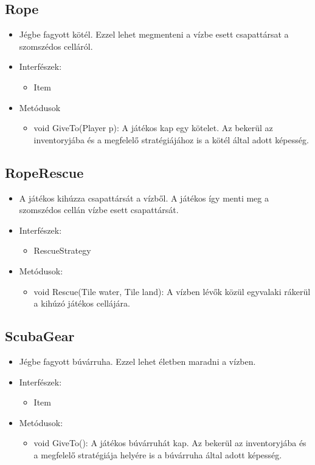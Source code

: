 \subsection{Rope}
\begin{itemize}
		\item Jégbe fagyott kötél. Ezzel lehet megmenteni a vízbe esett csapattársat a szomszédos celláról.
	\item Interfészek:
	\begin{itemize}
		\item Item
	\end{itemize}
	\item Metódusok
	\begin{itemize}
		\item void GiveTo(Player p): A játékos kap egy kötelet. Az bekerül az inventoryjába és a megfelelő stratégiájához is a kötél által adott képesség.
	\end{itemize}
\end{itemize}

\subsection{RopeRescue}
\begin{itemize}
		\item A játékos kihúzza csapattársát a vízből. A játékos így menti meg a szomszédos cellán vízbe esett csapattársát.
	\item Interfészek:
	\begin{itemize}
		\item RescueStrategy
	\end{itemize}
	\item Metódusok:
	\begin{itemize}
		\item void Rescue(Tile water, Tile land): A vízben lévők közül egyvalaki rákerül a kihúzó játékos cellájára.
	\end{itemize}
\end{itemize}

\subsection{ScubaGear}
\begin{itemize}
		\item Jégbe fagyott búvárruha. Ezzel lehet életben maradni a vízben.
	\item Interfészek:
	\begin{itemize}
		\item Item
	\end{itemize}
	\item Metódusok:
	\begin{itemize}
		\item void GiveTo(): A játékos búvárruhát kap. Az bekerül az inventoryjába és a megfelelő stratégiája helyére is a búvárruha által adott képesség.
	\end{itemize}
\end{itemize}

